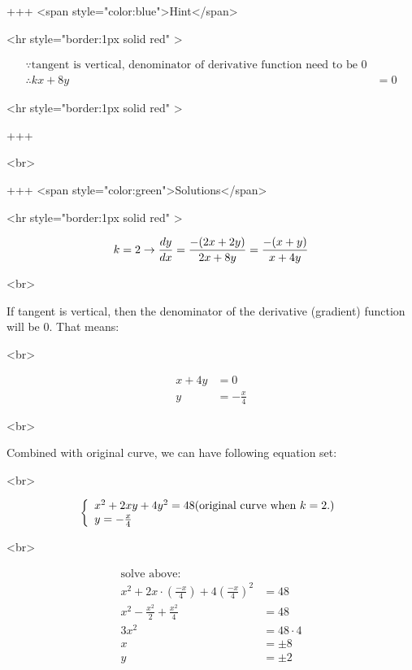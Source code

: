 +++ <span style="color:blue">Hint</span>

<hr style="border:1px solid red" >

$$
\begin{aligned}
\because \text{tangent is vertical, denominator of derivative function need to be 0}\\
\therefore kx+8 y & =0
\end{aligned}
$$

<hr style="border:1px solid red" >

+++

<br>

+++ <span style="color:green">Solutions</span>

<hr style="border:1px solid red" >

$$
k=2 \rightarrow \frac{d y}{d x}=\frac{-(2 x+2 y)}{2 x+8 y}=\frac{-(x+y)}{x+4 y}\\
$$

<br>

If tangent is vertical, then the denominator of the derivative (gradient) function will be 0. That means:

<br>

$$
\begin{aligned}
x+4 y & =0 \\
y & =-\frac{x}{4}
\end{aligned}
$$

<br>

Combined with original curve, we can have following equation set:

<br>

$$
\begin{aligned}
\left\{\begin{array}{l}
x^2+2 x y+4 y^2=48 \space\space\space\text {(original curve when $k=2$.)}\\
y=-\frac{x}{4}\\
\end{array}\right.\\
\end{aligned}
$$

<br>

$$
\begin{aligned}
\text{solve above:}\\
x^2+2 x \cdot\left(\frac{-x}{4}\right)+4\left(\frac{-x}{4}\right)^2&=48\\
x^2-\frac{x^2}{2}+\frac{x^2}{4}&=48\\
3 x^2&=48 \cdot 4\\
x &= \pm 8\\
y &= \pm 2
\end{aligned}
$$

